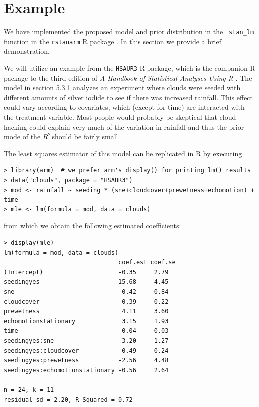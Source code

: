 \documentclass[11pt]{article}
\newcommand{\Rsq}{$R^2\,$}
\begin{document}
\section{Example}
\label{sec:example}


We have implemented the proposed model and prior distribution in the {\tt
stan\_lm} function in the {\tt rstanarm} R package \cite{rstanarm}. In this
section we provide a brief demonstration.

We will utilize an example from the {\tt HSAUR3} R package, which is the
companion R package to the third edition of \emph{A Handbook of Statistical
Analyses Using R} \cite{HSAUR3-book}. The model in section 5.3.1 analyzes an
experiment where clouds were seeded with different amounts of silver iodide to
see if there was increased rainfall. This effect could vary according to
covariates, which (except for time) are interacted with the treatment variable.
Most people would probably be skeptical that cloud hacking could explain very
much of the variation in rainfall and thus the prior mode of the \Rsq should be
fairly small.

The least squares estimator of this model can be replicated in R by executing

\vspace{.5cm}
\begin{lstlisting}[frame=lines]
> library(arm)  # we prefer arm's display() for printing lm() results
> data("clouds", package = "HSAUR3")
> mod <- rainfall ~ seeding * (sne+cloudcover+prewetness+echomotion) + time
> mle <- lm(formula = mod, data = clouds)
\end{lstlisting}
\vspace{.5cm}

\noindent from which we obtain the following estimated coefficients:

\vspace{.5cm}
\begin{lstlisting}[frame=lines]
> display(mle)
lm(formula = mod, data = clouds)
                                coef.est coef.se
(Intercept)                     -0.35     2.79
seedingyes                      15.68     4.45
sne                              0.42     0.84
cloudcover                       0.39     0.22
prewetness                       4.11     3.60
echomotionstationary             3.15     1.93
time                            -0.04     0.03
seedingyes:sne                  -3.20     1.27
seedingyes:cloudcover           -0.49     0.24
seedingyes:prewetness           -2.56     4.48
seedingyes:echomotionstationary -0.56     2.64
---
n = 24, k = 11
residual sd = 2.20, R-Squared = 0.72
\end{lstlisting}
\vspace{.5cm}
\end{document}
